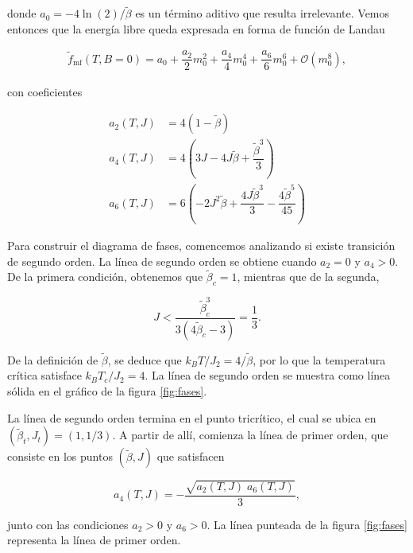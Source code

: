 \documentclass[10pt]{article}
\begin{document}
donde $a_0 = -4\ln(2)/\tilde{\beta}$ es un t\'ermino aditivo que resulta irrelevante. Vemos entonces que la energ\'ia libre queda expresada en forma de funci\'on de Landau

\begin{align}
\tilde{f}_{\mathrm{mf}}(T,B=0) = a_0 + \dfrac{a_2}{2} m_0^2 + 
\dfrac{a_4}{4} m_0^4 + \dfrac{a_6}{6} m_0^6 + \mathcal{O}(m_0^8),
\end{align}

con coeficientes 

\begin{align*}
a_2(T,J) &= 4 (1-\tilde{\beta})\\
a_4(T,J) &= 4\left( 3J - 4J\tilde{\beta} + \dfrac{\tilde{\beta}^3}{3} \right) \\
a_6(T,J) &= 6 \left(-2 J^2\tilde{\beta} + \dfrac{4J\tilde{\beta}^3}{3} - \dfrac{4\tilde{\beta}^5}{45}\right)
\end{align*}

Para construir el diagrama de fases, comencemos analizando si existe transici\'on de segundo orden. La l\'inea de segundo orden se obtiene cuando $a_2=0$ y $a_4>0$. De la primera condici\'on, obtenemos que $\tilde{\beta}_c = 1$, mientras que de la segunda,


\begin{equation}
J < \dfrac{\tilde{\beta}_c^3}{3(4\tilde{\beta}_c-3)}=\dfrac{1}{3}.
\end{equation}

De la definici\'on de $\tilde{\beta}$, se deduce que $k_B T/J_2 = 4 /\tilde{\beta}$, por lo que la temperatura cr\'itica satisface $k_B T_c/J_2 = 4$. La l\'inea de segundo orden se muestra como l\'inea s\'olida en el gr\'afico de la figura \ref{fig:fases}.

La l\'inea de segundo orden termina en el punto tricr\'itico, el cual se ubica en $(\tilde{\beta}_t, J_t)=(1, 1/3)$. A partir de all\'i, comienza la l\'inea de primer orden, que consiste en los puntos $(\tilde{\beta}, J)$ que satisfacen 

\begin{equation}
a_4(T, J)=-\dfrac{\sqrt{a_2(T,J)\;a_6(T,J)}}{3},
\end{equation}

junto con las condiciones $a_2>0$ y $a_6>0$. La l\'inea punteada de la figura \ref{fig:fases} representa la l\'inea de primer orden.
\end{document}
